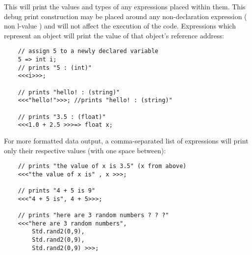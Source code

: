 This will print the values and types of any expressions placed within them. This debug print construction may be placed around any non-declaration expression ( non l-value ) and will not affect the execution of the code. Expressions which represent an object will print the value of that object's reference address:
\begin{verbatim}
    // assign 5 to a newly declared variable
    5 => int i;
    // prints "5 : (int)"
    <<<i>>>;

    // prints "hello! : (string)"
    <<<"hello!">>>; //prints "hello! : (string)"

    // prints "3.5 : (float)"
    <<<1.0 + 2.5 >>>=> float x;
\end{verbatim}

For more formatted data output, a comma-separated list of expressions will print only their respective values (with one space between):
\begin{verbatim}
    // prints "the value of x is 3.5" (x from above)
    <<<"the value of x is" , x >>>;

    // prints "4 + 5 is 9"
    <<<"4 + 5 is", 4 + 5>>>;

    // prints "here are 3 random numbers ? ? ?"
    <<<"here are 3 random numbers", 
        Std.rand2(0,9), 
        Std.rand2(0,9),
        Std.rand2(0,9) >>>; 
\end{verbatim}
 

